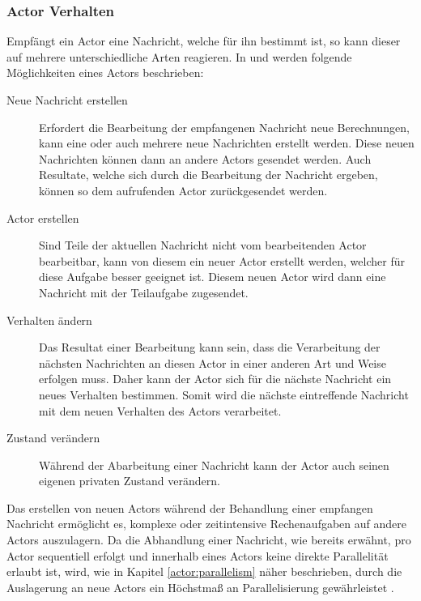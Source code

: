 \subsubsection{Actor Verhalten}
\label{actorBehaviour}
Empfängt ein Actor eine Nachricht, welche für ihn bestimmt ist, so kann dieser auf mehrere unterschiedliche Arten reagieren. In \citep{Agha1985ActorsSystems} und \citep{Vernon2015ReactiveAkka} werden folgende Möglichkeiten eines Actors beschrieben:
\begin{description}
    \item[Neue Nachricht erstellen] Erfordert die Bearbeitung der empfangenen Nachricht neue Berechnungen, kann eine oder auch mehrere neue Nachrichten erstellt werden. Diese neuen Nachrichten können dann an andere Actors gesendet werden. Auch Resultate, welche sich durch die Bearbeitung der Nachricht ergeben, können so dem aufrufenden Actor zurückgesendet werden.
    \item[Actor erstellen] Sind Teile der aktuellen Nachricht nicht vom bearbeitenden Actor bearbeitbar, kann von diesem ein neuer Actor erstellt werden, welcher für diese Aufgabe besser geeignet ist. Diesem neuen Actor wird dann eine Nachricht mit der Teilaufgabe zugesendet.
    \item[Verhalten ändern] Das Resultat einer Bearbeitung kann sein, dass die Verarbeitung der nächsten Nachrichten an diesen Actor in einer anderen Art und Weise erfolgen muss. Daher kann der Actor sich für die nächste Nachricht ein neues Verhalten bestimmen. Somit wird die nächste eintreffende Nachricht mit dem neuen Verhalten des Actors verarbeitet.
    \item[Zustand verändern] Während der Abarbeitung einer Nachricht kann der Actor auch seinen eigenen privaten Zustand verändern.
\end{description}
Das erstellen von neuen Actors während der Behandlung einer empfangen Nachricht ermöglicht es, komplexe oder zeitintensive Rechenaufgaben auf andere Actors auszulagern. Da die Abhandlung einer Nachricht, wie bereits erwähnt, pro Actor sequentiell erfolgt und innerhalb eines Actors keine direkte Parallelität erlaubt ist, wird, wie in Kapitel \ref{actor:parallelism} näher beschrieben, durch die Auslagerung an neue Actors ein Höchstmaß an Parallelisierung gewährleistet \citep{Agha1985ConcurrentParallelism}.

